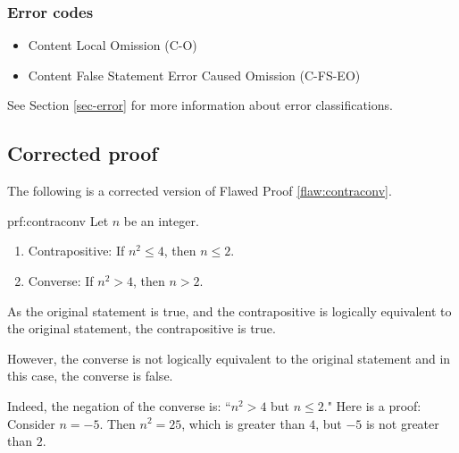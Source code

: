  
\subsubsection{Error codes}
\begin{itemize}
	\item 	Content Local Omission (C-O)
	\item   Content False Statement Error Caused Omission (C-FS-EO)
\end{itemize}
See Section \ref{sec-error} for more information about error classifications.

\clearpage
\subsection{Corrected proof}

The following is a corrected version of Flawed Proof \ref{flaw:contraconv}. 

\begin{prf}{prf:contraconv} 
Let $n$ be an integer.
\begin{enumerate}
\item Contrapositive: If $n^2 \leq 4$, then $n \leq 2.$ 
\item Converse: If $n^2>4$, then $n>2$. \\
\end{enumerate}
As the original statement is true, and the contrapositive is logically equivalent to the original statement, the contrapositive is true. 

However, the converse is not logically equivalent to the original statement and in this case, the converse is false. 

Indeed, the negation of the converse is: ``$n^2 > 4$ but $n \leq 2$." Here is a proof:
Consider $n = -5$. Then $n^2 = 25$, which is greater than $4$, but $-5$ is not greater than $2.$
\end{prf}